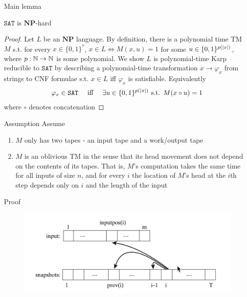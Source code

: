 \documentclass[presentation]{beamer}
\def \NP {\textbf{NP}}
\def \NP {\textbf{NP}}
\def \SAT {\texttt{SAT}}
\begin{document}
\begin{frame}[label={sec:orge7aa587}]{Main lemma}
\begin{lemma}[]
\(\SAT\) is \(\NP\)-hard
\end{lemma}

\begin{proof}
Let \(L\) be an \(\NP\) language. By definition, there is a polynomial time TM \(M\) s.t. for
every \(x\in\{0,1\}^*\), \(x\in L\Leftrightarrow M(x,u)=1\) for
some \(u\in\{0,1\}^{p(\abs{x})}\), where \(p:\mathbb{N}\to\mathbb{N}\) is some polynomial. We show \(L\) is
polynomial-time Karp reducible to \(\SAT\) by describing a polynomial-time
transformation \(x\to\varphi_x\) from strings to CNF formulae s.t. \(x\in L\) iff \(\varphi_x\)
is satisfiable. Equivalently
     \begin{equation*}
\varphi_x\in\SAT \quad\text{ iff }\quad\exists u\in\{0,1\}^{p(\abs{x})}
\text{ s.t. }M(x\circ u)=1
     \end{equation*}
where \(\circ\) denotes concatenation
\end{proof}
\end{frame}
\begin{frame}[label={sec:org5b5a03f}]{Assumption}
Assume
\begin{enumerate}
\item \(M\) only has two tapes - an input tape and a work/output tape
\item \(M\) is an oblivious TM in the sense that its head movement does not depend on the contents
of its tapes. That is, \(M\)'s computation takes the same time for all inputs of size \(n\),
and for every \(i\) the location of \(M\)'s head at the \(i\)th step depends only on \(i\)
and the length of the input
\end{enumerate}
\end{frame}
\begin{frame}[label={sec:orgb62f04f}]{Proof}
\begin{figure}[htbp]
\centering
\includegraphics[width=.8\textwidth]{./2.png}
\label{}
\end{figure}
\end{frame}
\end{document}
